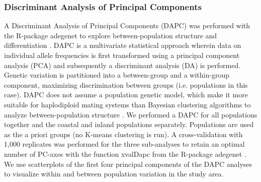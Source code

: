 \documentclass[10pt, twoside]{book} %
\begin{document}
	\subsubsection{Discriminant Analysis of Principal Components}
	A Discriminant Analysis of Principal Components (DAPC) was performed with the R-package adegenet to explore between-population structure and differentiation \citep{jombart2008, jombart2010}. DAPC is a multivariate statistical approach wherein data on individual allele frequencies is first transformed using a principal component analysis (PCA) and subsequently a discriminant analysis (DA) is performed. Genetic variation is partitioned into a between-group and a within-group component, maximizing discrimination between groups (i.e. populations in this case). DAPC does not assume a population genetic model, which make it more suitable for haplodiploid mating systems than Bayesian clustering algorithms to analyze between-population structure \citep{jombart2010, grunwald2011}. We performed a DAPC for all populations together and the coastal and inland populations separately. Populations are used as the a priori groups (no K-means clustering is run). A cross-validation with 1,000 replicates was performed for the three sub-analyses to retain an optimal number of PC-axes with the function xvalDapc from the R-package adegenet \citep{jombart2008, kamvar2015}. We use scatterplots of the first four principal components of the DAPC analyses to visualize within and between population variation in the study area.\\
	
\end{document}
